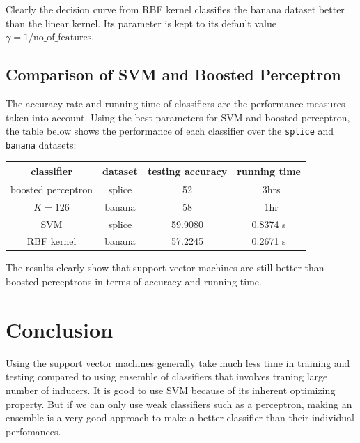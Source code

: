 \documentclass{article}
\begin{document}
Clearly the decision curve from RBF kernel classifies the banana dataset better than the linear kernel. Its parameter is kept to its default value $\gamma = 1/\text{no\_of\_features}$.

\subsection{Comparison of SVM and Boosted Perceptron}
The accuracy rate and running time of classifiers are the performance measures taken into account. Using the best parameters for SVM and boosted perceptron, the table below shows the performance of each classifier over the \texttt{splice} and \texttt{banana} datasets:

\begin{table}[H]
	\centering
	\begin{tabular}{c | c | c | c}
		\textbf{classifier} & \textbf{dataset} & \textbf{testing accuracy} & \textbf{running time} \\
		\hline
		boosted perceptron & splice & 52 & ~3hrs\\
		$K=126$ & banana & 58 & ~1hr\\
		\hline
		SVM & splice & 59.9080 & 0.8374 s\\
		RBF kernel & banana & 57.2245 & 0.2671 s\\
	\end{tabular}
\end{table}

The results clearly show that support vector machines are still better than boosted perceptrons in terms of accuracy and running time.

\section{Conclusion}
Using the support vector machines generally take much less time in training and testing compared to using ensemble of classifiers that involves traning large number of inducers. It is good to use SVM because of its inherent optimizing property. But if we can only use weak classifiers such as a perceptron, making an ensemble is a very good approach to make a better classifier than their individual perfomances.
\end{document}
